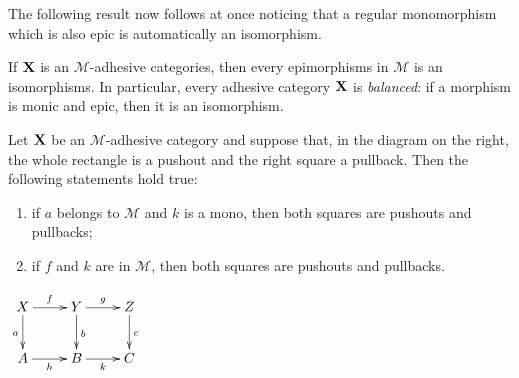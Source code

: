 \documentclass[a4paper,UKenglish,cleveref,pdftex, thm-restate,numberwithinsect,anonymous]{lipics}
\def\X{\textbf {\textup{X}}}
\begin{document}
The following result now follows at once noticing that a regular monomorphism which is also epic is automatically an isomorphism.

\begin{corollary}\label{prop:bal}
	If $\X$ is an $\mathcal{M}$-adhesive categories, then every epimorphisms in $\mathcal{M}$ is an isomorphisms. In particular, every adhesive category $\X$ is \emph{balanced}: if a morphism is monic and epic, then it is an isomorphism.
\end{corollary}

\noindent 
\parbox{10cm}{\begin{lemma}\label{lem:popb} Let $\X$ be an $\mathcal{M}$-adhesive category  and suppose that, in the diagram on the right, the whole rectangle is a pushout and the right square a pullback.	Then the following statements hold true:
\parbox{13cm}	{\begin{enumerate}
		\item if $a$ belongs to $\mathcal{M}$ and $k$ is a mono,  then both squares are pushouts and pullbacks;
		\item if $f$ and $k $ are in  $\mathcal{M}$, then both squares are pushouts and pullbacks.
	\end{enumerate}}
\end{lemma}}
\parbox{4cm}{\vspace{-1cm}
	$\xymatrix{X \ar[d]_{a} \ar[r]^{f}& \ar[r]^{g} Y \ar[d]^{b}& Z \ar[d]^{c}\\ A \ar[r]_{h}& B \ar[r]_{k}& C}$}\\
\end{document}
